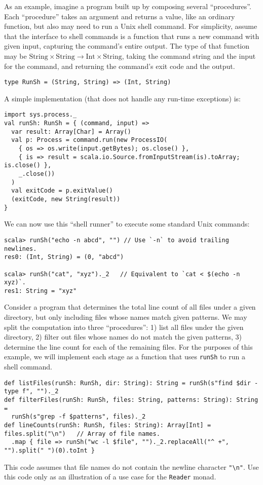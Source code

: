 As an example, imagine a program built up by composing several \textsf{``}procedures\textsf{''}.
Each \textsf{``}procedure\textsf{''} takes an argument and returns a value, like an
ordinary function, but also may need to run a Unix shell command.
For simplicity, assume that the interface to shell commands is a function
that runs a new command with given input, capturing the command\textsf{'}s
entire output. The type of that function may be $\text{String}\times\text{String}\rightarrow\text{Int}\times\text{String}$,
taking the command string and the input for the command, and returning
the command\textsf{'}s exit code and the output.
\begin{lstlisting}
type RunSh = (String, String) => (Int, String)
\end{lstlisting}
A simple implementation (that does not handle any run-time exceptions)
is:
\begin{lstlisting}
import sys.process._
val runSh: RunSh = { (command, input) =>
  var result: Array[Char] = Array()
  val p: Process = command.run(new ProcessIO(
    { os => os.write(input.getBytes); os.close() },
    { is => result = scala.io.Source.fromInputStream(is).toArray; is.close() },
    _.close())
  )
  val exitCode = p.exitValue()
  (exitCode, new String(result))
}
\end{lstlisting}
We can now use this \textsf{``}shell runner\textsf{''} to execute some standard Unix
commands:
\begin{lstlisting}
scala> runSh("echo -n abcd", "") // Use `-n` to avoid trailing newlines.
res0: (Int, String) = (0, "abcd")

scala> runSh("cat", "xyz")._2   // Equivalent to `cat < $(echo -n xyz)`.
res1: String = "xyz"
\end{lstlisting}

Consider a program that determines the total line count of all files
under a given directory, but only including files whose names match
given patterns. We may split the computation into three \textsf{``}procedures\textsf{''}:
1) list all files under the given directory, 2) filter out files whose
names do not match the given patterns, 3) determine the line count
for each of the remaining files. For the purposes of this example,
we will implement each stage as a function that uses \lstinline!runSh!
to run a shell command.
\begin{lstlisting}
def listFiles(runSh: RunSh, dir: String): String = runSh(s"find $dir -type f", "")._2
def filterFiles(runSh: RunSh, files: String, patterns: String): String =
  runSh(s"grep -f $patterns", files)._2
def lineCounts(runSh: RunSh, files: String): Array[Int] = files.split("\n")   // Array of file names.
  .map { file => runSh("wc -l $file", "")._2.replaceAll("^ +", "").split(" ")(0).toInt }
\end{lstlisting}
This code assumes that file names do not contain the newline character
\lstinline!"\n"!. Use this code only as an illustration of a use
case for the \lstinline!Reader! monad.

